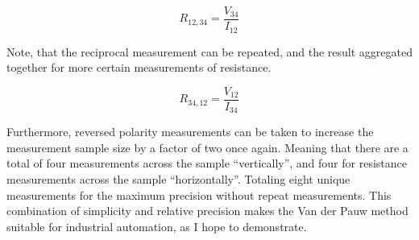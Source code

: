 \begin{equation}
	R_{12,34}=\dfrac{V_{34}}{I_{12}} 
\end{equation}

	Note, that the reciprocal measurement can be repeated, and the result aggregated together for more certain measurements of resistance.

\begin{equation}
	R_{34,12}=\dfrac{V_{12}}{I_{34}} 
\end{equation}

	Furthermore, reversed polarity measurements can be taken to increase the measurement sample size by a factor of two once again. Meaning that there are a total of four measurements across the sample “vertically”, and four for resistance measurements across the sample “horizontally”. Totaling eight unique measurements for the maximum precision without repeat measurements.
This combination of simplicity and relative precision makes the Van der Pauw method suitable for industrial automation, as I hope to demonstrate.
